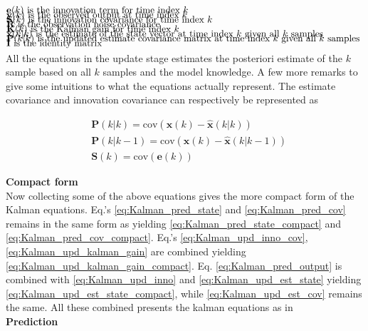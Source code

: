 \begin{align*}
	&\text{$\textbf{e}		(k)$ 		is the innovation term for time index 					$ k $													}	\\[-1em]
	&\text{$\textbf{y}		(k)$ 		is the observed output at time index 					$ k $													}	\\[-1em]
	&\text{$\textbf{S}		(k)$ 		is the innovation covariance for time index 			$ k $											}	\\[-1em]
	&\text{$\textbf{R}$ 				is the observation noise covariance																}	\\[-1em]
	&\text{$\textbf{K}		(k)$ 		is the Kalman gain for time index 						$ k $													}	\\[-1em]
	&\text{$\hat{\textbf{x}}(k|k)$ 	is the estimate of the state vector at time index 			$ k $ given all 	$ k$ samples	}	\\[-1em]
	&\text{$\textbf{P}		(k|k)$ 	is the updated estimate covariance matrix at time index 	$ k $ given all 	$ k$ samples		}	\\[-1em]
	&\text{$\textbf{I}$ 				is the identity matrix																				}	\\[-1em]			
\end{align*}

All the equations in the update stage estimates the posteriori estimate of the $ k $ sample based on all $ k $ samples and the model knowledge. A few more remarks to give some intuitions to what the equations actually represent. The estimate covariance and innovation covariance can respectively be represented as 

\begin{align}
	&\textbf{P}(k|k) 	= \text{cov}(\textbf{x}(k)-	\hat{\textbf{x}}(k|k))	\\
	&\textbf{P}(k|k-1) 	= \text{cov}(\textbf{x}(k)-	\hat{\textbf{x}}(k|k-1)) 		\\
	&\textbf{S}(k) 		= \text{cov}(\textbf{e}(k)) 
\end{align}

\textbf{Compact form}\\
Now collecting some of the above equations gives the more compact form of the Kalman equations.
Eq.'s \ref{eq:Kalman_pred_state} and \ref{eq:Kalman_pred_cov} remains in the same form as yielding \cref{eq:Kalman_pred_state_compact} and \cref{eq:Kalman_pred_cov_compact}. Eq.'s \ref{eq:Kalman_upd_inno_cov}, \ref{eq:Kalman_upd_kalman_gain} are combined yielding \cref{eq:Kalman_upd_kalman_gain_compact}. Eq. \ref{eq:Kalman_pred_output} is combined with \cref{eq:Kalman_upd_inno} and \cref{eq:Kalman_upd_est_state} yielding \cref{eq:Kalman_upd_est_state_compact}, while \cref{eq:Kalman_upd_est_cov} remains the same. All these combined presents the kalman equations as in \cite{Li2016}\\
\textbf{Prediction}

